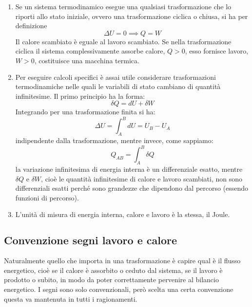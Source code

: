 \documentclass[class=book, crop=false, oneside, 12pt]{standalone}
\begin{document}
\begin{enumerate}
    \item Se un sistema termodinamico esegue una qualsiasi trasformazione che lo riporti allo stato iniziale, ovvero una trasformazione ciclica o chiusa, si ha per definizione
    \begin{equation}
        \Delta U = 0 \implies Q = W
    \end{equation}
    Il calore scambiato è eguale al lavoro scambiato. 
    Se nella trasformazione ciclica il sistema complessivamente assorbe calore, \(Q > 0\), esso fornisce lavoro, \(W > 0\), costituisce una macchina termica. 
    \item Per eseguire calcoli specifici è assai utile considerare trasformazioni termodinamiche nelle quali le variabili di stato cambiano di quantità infinitesime.
    Il primo principio ha la forma:
    \begin{equation*}
        \delta Q = d U + \delta W
    \end{equation*}
    Integrando per una trasformazione finita si ha:
    \begin{equation*}
        \Delta U = \int_A^B d U = U_B - U_A
    \end{equation*}
    indipendente dalla trasformazione, mentre invece, come sappiamo:
    \begin{equation*}
        Q_{AB} = \int_A^B \delta Q
    \end{equation*}
    la variazione infinitesima di energia interna è un differenziale esatto, mentre \(\delta Q \) e \(\delta W\), cioè le quantità infinitesime di calore e lavoro scambiati, non sono differenziali esatti perché sono grandezze che dipendono dal percorso (essendo funzioni di percorso).
    \item L'unità di misura di energia interna, calore e lavoro è la stessa, il Joule.
\end{enumerate}

\subsection{Convenzione segni lavoro e calore}


Naturalmente quello che importa in una trasformazione è capire qual è il flusso energetico, cioè se il calore è assorbito o ceduto dal sistema, se il lavoro è prodotto o subito, in modo da poter correttamente pervenire al bilancio energetico. 
I segni sono solo convenzionali, però scelta una certa convenzione questa va mantenuta in tutti i ragionamenti.
\end{document}
